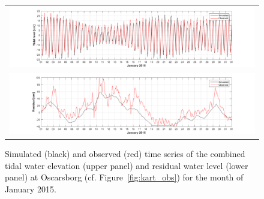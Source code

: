 \begin{figure}[htb]
  \begin{center}
    \begin{tabular}{c}
      \includegraphics*[trim=3cm 0cm 2.5cm 0cm,clip=true,width=15cm]{Figurer/Oscarsborg_Tide_selected_jan15} \\ 
      \includegraphics*[trim=3cm 0cm 2.5cm 0cm,clip=true,width=15cm]{Figurer/Oscarsborg_WL_rest_jan15} \\ 
    \end{tabular}
    \caption{\small Simulated (black) and observed (red) time series of the combined tidal water elevation (upper panel) and residual water level (lower panel) at Oscarsborg (cf. Figure~\ref{fig:kart_obs}) for the month of January 2015.}
    \label{fig:Waterlevel_jan15}
  \end{center}
\end{figure}


